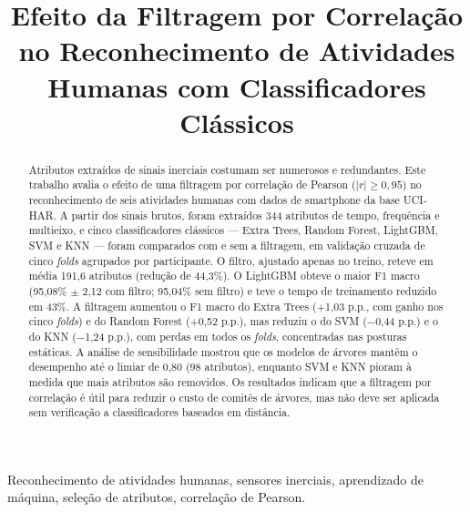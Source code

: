 \documentclass[conference]{IEEEtran}
\begin{document}
\title{Efeito da Filtragem por Correlação no Reconhecimento de Atividades Humanas com Classificadores Clássicos}

\author{
\and
{}
}

\maketitle

\begin{abstract}
Atributos extraídos de sinais inerciais costumam ser numerosos e redundantes. Este trabalho avalia o efeito de uma filtragem por correlação de Pearson ($|r|\geq0{,}95$) no reconhecimento de seis atividades humanas com dados de smartphone da base UCI-HAR. A partir dos sinais brutos, foram extraídos 344 atributos de tempo, frequência e multieixo, e cinco classificadores clássicos --- Extra Trees, Random Forest, LightGBM, SVM e KNN --- foram comparados com e sem a filtragem, em validação cruzada de cinco \textit{folds} agrupados por participante. O filtro, ajustado apenas no treino, reteve em média 191,6 atributos (redução de 44,3\%). O LightGBM obteve o maior F1 macro (95,08\% $\pm$ 2,12 com filtro; 95,04\% sem filtro) e teve o tempo de treinamento reduzido em 43\%. A filtragem aumentou o F1 macro do Extra Trees (+1,03 p.p., com ganho nos cinco \textit{folds}) e do Random Forest (+0,52 p.p.), mas reduziu o do SVM ($-$0,44 p.p.) e o do KNN ($-$1,24 p.p.), com perdas em todos os \textit{folds}, concentradas nas posturas estáticas. A análise de sensibilidade mostrou que os modelos de árvores mantêm o desempenho até o limiar de 0,80 (98 atributos), enquanto SVM e KNN pioram à medida que mais atributos são removidos. Os resultados indicam que a filtragem por correlação é útil para reduzir o custo de comitês de árvores, mas não deve ser aplicada sem verificação a classificadores baseados em distância.
\end{abstract}

\begin{IEEEkeywords}
Reconhecimento de atividades humanas, sensores inerciais, aprendizado de máquina, seleção de atributos, correlação de Pearson.
\end{IEEEkeywords}
\end{document}
